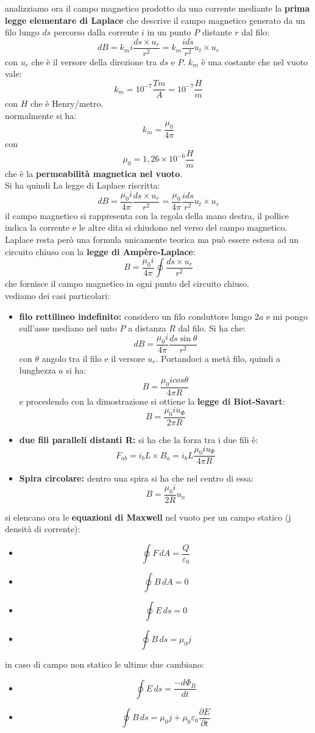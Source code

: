 \documentclass[a4paper,12pt, oneside]{book}
\begin{document}
analizziamo ora il campo magnetico prodotto da una corrente mediante la \textbf{prima legge elementare di Laplace} che descrive il campo magnetico generato da un filo lungo $ds$ percorso dalla corrente $i$ in un punto $P$ distante $r$ dal filo:
$$dB=k_mi\frac{ds\times u_r}{r^2}=k_m\frac{ids}{r^2}u_t\times u_r$$
con $u_r$ che è il versore della direzione tra $ds$ e $P$. $k_m$ è una costante che nel vuoto vale:
$$k_m=10^{-7}\frac{Tm}{A}=10^{-7}\frac{H}{m}$$
con $H$ che è Henry/metro.\\
normalmente si ha:
$$k_m=\frac{\mu_0}{4\pi}$$
con
$$\mu_0=1,26\times 10^{-6}\frac{H}{m}$$
che è la \textbf{permeabilità magnetica nel vuoto}.\\
Si ha quindi La legge di Laplace riscritta:
$$dB=\frac{\mu_0i}{4\pi}\frac{ds\times u_r}{r^2}=\frac{\mu_0}{4\pi}\frac{ids}{r^2}u_t\times u_r$$
il campo magnetico si rappresenta con la regola della mano destra, il pollice indica la corrente e le altre dita si chiudono nel verso del campo magnetico.\\ Laplace resta però una formula unicamente teorica ma può essere estesa ad un circuito chiuso con la \textbf{legge di Ampère-Laplace}:
$$B=\frac{\mu_0i}{4\pi}\oint\frac{ds\times u_r}{r^2}$$
che fornisce il campo magnetico in ogni punto del circuito chiuso.\\
vediamo dei casi particolari:
\begin{itemize}
\item \textbf{filo rettilineo indefinito:} considero un filo conduttore lungo $2a$ e mi pongo sull'asse mediano nel unto $P$ a distanza $R$ dal filo. Si ha che:
$$dB=\frac{\mu_0i}{4\pi}\frac{ds\sin\theta}{r^2}$$
con $\theta$ angolo tra il filo e il versore $u_r$. Portandoci a metà filo, quindi a lunghezza $a$ si ha:
$$B=\frac{\mu_0icos\theta}{4\pi R}$$
e procedendo con la dimostrazione si ottiene la \textbf{legge di Biot-Savart}:
$$B=\frac{\mu_0 iu_\Phi}{2\pi R}$$
\item \textbf{due fili paralleli distanti R:} si ha che la forza tra i due fili è:
$$F_{ab}=i_bL\times B_a=i_bL\frac{\mu_0iu_\Phi}{4\pi R}$$
\item \textbf{Spira circolare:} dentro una spira si ha che nel centro di essa:
$$B=\frac{\mu_0i}{2 R}u_n$$
\end{itemize}
si elencano ora le \textbf{equazioni di Maxwell} nel vuoto per un campo statico (j densità di corrente):
\begin{itemize}
\item $$\oint F\,dA=\frac{Q}{\varepsilon_0}$$
\item  $$\oint B\,dA=0$$
\item  $$\oint E\,ds=0$$
\item  $$\oint B\,ds=\mu_0 j$$
\end{itemize}
in caso di campo non statico le ultime due cambiano:
\begin{itemize}
\item  $$\oint E\,ds=\frac{-d\Phi_B}{dt}$$
\item  $$\oint B\,ds=\mu_0 j+\mu_0\varepsilon_0\frac{\partial E}{\partial t}$$
\end{itemize}
\end{document}
